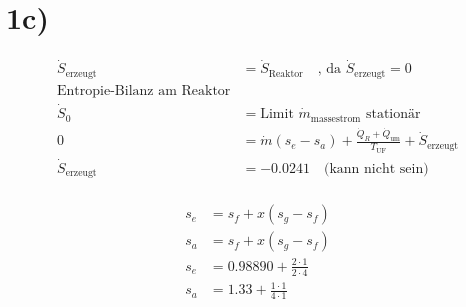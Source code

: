 

\section*{1c)}

\begin{align*}
\dot{S}_{\text{erzeugt}} &= \dot{S}_{\text{Reaktor}} \quad \text{, da } \dot{S}_{\text{erzeugt}} = 0 \\
\text{Entropie-Bilanz am Reaktor} \\
\dot{S}_{0} &= \text{Limit } \dot{m}_{\text{massestrom}} \text{ stationär} \\
0 &= \dot{m} (s_e - s_a) + \frac{\dot{Q}_R + \dot{Q}_{\text{um}}}{T_{\text{UF}}} + \dot{S}_{\text{erzeugt}} \\
\dot{S}_{\text{erzeugt}} &= -0.0241 \quad \text{(kann nicht sein)} \\
\end{align*}

\begin{align*}
s_e &= s_f + x \left( s_g - s_f \right) \\
s_a &= s_f + x \left( s_g - s_f \right) \\
s_e &= 0.98890 + \frac{2 \cdot 1}{2 \cdot 4} \\
s_a &= 1.33 + \frac{1 \cdot 1}{4 \cdot 1} \\
\end{align*}